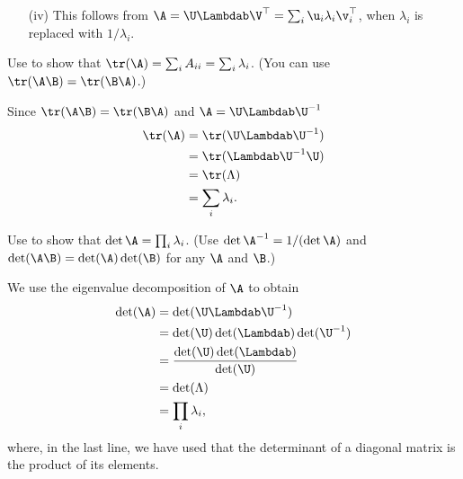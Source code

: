 \begin{exenumerate}
\begin{solution}
\begin{enumerate}
    \item[(iv)] This follows from $\A = \U \Lambdab \V^\top = \sum_i \u_i \lambda_i \v_i^\top$, when $\lambda_i$ is replaced with $1/\lambda_i$.
    \end{enumerate}
  \end{solution}  
\end{exenumerate}


\label{ex:trace-determinants-eigenvalues}
\begin{exenumerate}
\item Use  to show that $\tr(\A)=\sum_i A_{ii} = \sum_i\lambda_i$. (You can use $\tr(\A\B)=\tr(\B\A)$.)
  \begin{solution}
    Since $\tr(\A\B) = \tr(\B\A)$ and $\A = \U\Lambdab \U^{-1}$
    \begin{align}
      \tr(\A)  &= \tr(\U\Lambdab \U^{-1}) \\
               &= \tr(\Lambdab \U^{-1}\U) \\
               &= \tr(\Lambda)\\
               &= \sum_i \lambda_i.
    \end{align}
  \end{solution}

\item Use  to show that $\det \A = \prod_i \lambda_i$. (Use $\det \A^{-1}=1/(\det \A)$ and $\det(\A\B)=\det(\A)\det(\B)$ for any $\A$ and $\B$.)
  \begin{solution}
    We use the eigenvalue decomposition of $\A$ to obtain
    \begin{align}
      \det(\A) &= \det(\U\Lambdab \U^{-1})\\
               &= \det(\U)\det(\Lambdab)\det(\U^{-1}) \\
               &= \frac{\det(\U)\det(\Lambdab)}{\det(\U)}\\
               &= \det(\Lambda)\\
               &= \prod_i \lambda_i,
    \end{align}
    where, in the last line, we have used that the determinant of a diagonal matrix is the product of its elements.

  \end{solution}
\end{exenumerate}



